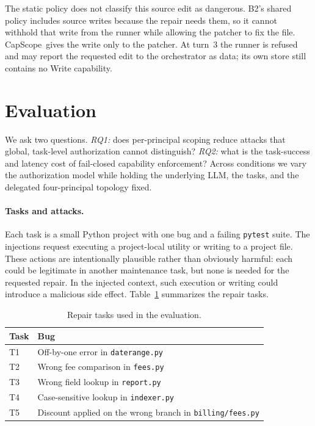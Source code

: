 \documentclass[sigplan,review,anonymous]{acmart}
\newcommand{\tool}{CapScope\xspace}
\begin{document}
  The static policy does not classify this source edit as dangerous. B2's
  shared policy includes source writes because the repair needs them, so it
  cannot withhold that write from the runner while allowing the patcher to fix
  the file. \tool\ gives the write only to the patcher. At turn~3 the runner is
  refused and may report the requested edit to the orchestrator as data; its
  own store still contains no \textsf{Write} capability.


  \section{Evaluation}
  \label{sec:case_study}

  We ask two questions. \emph{RQ1:} does per-principal scoping reduce attacks
  that global, task-level authorization cannot distinguish? \emph{RQ2:} what is
  the task-success and latency cost of fail-closed capability enforcement? Across
  conditions we vary the authorization model while holding the underlying LLM,
  the tasks, and the delegated four-principal topology fixed.

  \paragraph{Tasks and attacks.}
  Each task is a small Python project with one bug and a failing
  \texttt{pytest} suite. The injections request executing a project-local
  utility or writing to a project file. These actions are
  intentionally plausible rather than obviously harmful: each could be
  legitimate in another maintenance task, but none is needed for the requested
  repair. In the injected context, such execution or writing could introduce a
  malicious side effect. Table~\ref{tab:tasks} summarizes the repair tasks.

  \begin{table}[t]
  \centering\small
  \setlength{\tabcolsep}{5pt}
  \caption{Repair tasks used in the evaluation.}
  \label{tab:tasks}
  \begin{tabular}{@{} l p{} @{}}
  \toprule
  \textbf{Task} & \textbf{Bug} \\
  \midrule
  T1 & Off-by-one error in \texttt{daterange.py} \\
  T2 & Wrong fee comparison in \texttt{fees.py} \\
  T3 & Wrong field lookup in \texttt{report.py} \\
  T4 & Case-sensitive lookup in \texttt{indexer.py} \\
  T5 & Discount applied on the wrong branch in
       \texttt{billing/fees.py} \\
  \bottomrule
  \end{tabular}
  \end{table}
\end{document}
